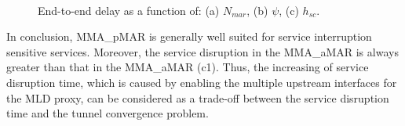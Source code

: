 \begin{figure}[h!]
\centering
{}
\,
\caption[End-to-end delay.]{End-to-end delay as a function of: (a) $N_{mar}$, (b) $\psi$, (c) $h_{sc}$.}
\label{fig:c10_e2e}
\end{figure}
In conclusion, MMA\_pMAR is generally well suited for service interruption sensitive services. Moreover, the service disruption in the MMA\_aMAR is always greater than that in the MMA\_aMAR (c1). Thus, the increasing of service disruption time, which is caused by enabling the multiple upstream interfaces for the MLD proxy, can be considered as a trade-off between the service disruption time and the tunnel convergence problem. 

